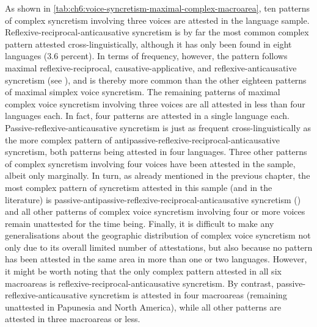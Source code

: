 As shown in \ref{tab:ch6:voice-syncretism-maximal-complex-macroarea}, ten patterns of complex syncretism involving three voices are attested in the language sample. Reflexive-reciprocal-anticausative syncretism is by far the most common complex pattern attested cross-linguistically, although it has only been found in eight languages (3.6 percent). In terms of frequency, however, the pattern follows maximal reflexive-reciprocal, causative-applicative, and reflexive-anticausative syncretism (see ), and is thereby more common than the other eighteen patterns of maximal simplex voice syncretism. The remaining patterns of maximal complex voice syncretism involving three voices are all attested in less than four languages each. In fact, four patterns are attested in a single language each. Passive-reflexive-anticausative syncretism is just as frequent cross-linguistically as the more complex pattern of antipassive-reflexive-reciprocal-anticausative syncretism, both patterns being attested in four languages. Three other patterns of complex syncretism involving four voices have been attested in the sample, albeit only marginally. In turn, as already mentioned in the previous chapter, the most complex pattern of syncretism attested in this sample (and in the literature) is passive-antipassive-reflexive-reciprocal-anticausative syncretism () and all other patterns of complex voice syncretism involving four or more voices remain unattested for the time being. Finally, it is difficult to make any generalisations about the geographic distribution of complex voice syncretism not only due to its overall limited number of attestations, but also because no pattern has been attested in the same area in more than one or two languages. However, it might be worth noting that the only complex pattern attested in all six macroareas is reflexive-reciprocal-anticausative syncretism. By contrast, passive-reflexive-anticausative syncretism is attested in four macroareas (remaining unattested in Papunesia and North America), while all other patterns are attested in three macroareas or less.


